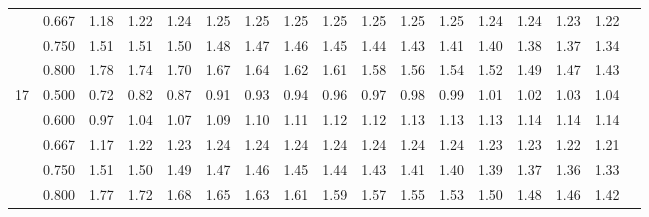 \documentclass[pdftex,11pt,openany]{book}\usepackage[]{graphicx}\usepackage[]{color}
\begin{document}
{\begin{center}
\begin{tabular}{rrr@{\,}r@{\,}r@{\,}r@{\,}r@{\,}r@{\,}r@{\,}r
                   @{\,}r@{\,}r@{\,}r@{\,}r@{\,}r@{\,}r@{\,}r}
  &0.667&1.18&1.22&1.24&1.25&1.25&1.25&1.25&1.25&1.25&1.25&1.24&1.24&1.23&1.22\\
  &0.750&1.51&1.51&1.50&1.48&1.47&1.46&1.45&1.44&1.43&1.41&1.40&1.38&1.37&1.34\\
  &0.800&1.78&1.74&1.70&1.67&1.64&1.62&1.61&1.58&1.56&1.54&1.52&1.49&1.47&1.43\\
17&0.500&0.72&0.82&0.87&0.91&0.93&0.94&0.96&0.97&0.98&0.99&1.01&1.02&1.03&1.04\\
  &0.600&0.97&1.04&1.07&1.09&1.10&1.11&1.12&1.12&1.13&1.13&1.13&1.14&1.14&1.14\\
  &0.667&1.17&1.22&1.23&1.24&1.24&1.24&1.24&1.24&1.24&1.24&1.23&1.23&1.22&1.21\\
  &0.750&1.51&1.50&1.49&1.47&1.46&1.45&1.44&1.43&1.41&1.40&1.39&1.37&1.36&1.33\\
  &0.800&1.77&1.72&1.68&1.65&1.63&1.61&1.59&1.57&1.55&1.53&1.50&1.48&1.46&1.42
\end{tabular}
\end{center}

\newpage


}
\end{document}
